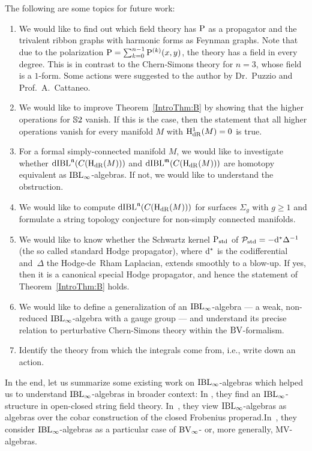 \documentclass[\MainFolder/Text.tex]{subfiles}
\begin{document}
The following are some topics for future work:

\begin{enumerate}[label=(\arabic*)]
\item We would like to find out which field theory has $\mathrm{P}$ as a propagator and the trivalent ribbon graphs with harmonic forms as Feynman graphs. Note that due to the polarization $\mathrm{P} = \sum_{k=0}^{n-1}\mathrm{P}^{(k)}(x,y)$, the theory has a field in every degree. This is in contrast to the Chern-Simons theory for $n=3$, whose field is a $1$-form. Some actions were suggested to the author by Dr.~Puzzio and Prof.~A.~Cattaneo.

\item We would like to improve Theorem~\ref{IntroThm:B} by showing that the higher operations for $\mathbb{S}{2}$ vanish. If this is the case,  then the statement that all higher operations vanish for every manifold $M$ with $\mathrm{H}_{\mathrm{dR}}^1(M)=0$ is true.
\item For a formal simply-connected manifold $M$, we would like to investigate whether $\mathrm{dIBL}^{\mathfrak{n}}(C(\mathrm{H}_{\mathrm{dR}}(M)))$ and $\mathrm{dIBL}^{\mathfrak{m}}(C(\mathrm{H}_{\mathrm{dR}}(M)))$ are homotopy equivalent as $\mathrm{IBL}_\infty$-algebras. If not, we would like to understand the obstruction. 
\item We would like to compute $\mathrm{dIBL}^{\mathfrak{n}}(C(\mathrm{H}_{\mathrm{dR}}(M)))$ for surfaces $\Sigma_g$ with $g\ge 1$ and formulate a string topology conjecture for non-simply connected manifolds. 
\item We would like to know whether the Schwartz kernel $\mathrm{P}_{\mathrm{std}}$ of $\mathcal{P}_{\mathrm{std}}=-\mathrm{d}^* \Delta^{-1}$ (the so called standard Hodge propagator), where $\mathrm{d}^*$ is the codifferential and~$\Delta$ the Hodge-de~Rham Laplacian, extends smoothly to a blow-up. If yes, then it is a canonical special Hodge propagator, and hence the statement of Theorem~\ref{IntroThm:B} holds.
\item We would like to define a generalization of an $\mathrm{IBL}_\infty$-algebra --- a weak, non-reduced $\mathrm{IBL}_\infty$-algebra with a gauge group --- and understand its precise relation to perturbative Chern-Simons theory within the $\mathrm{BV}$-formalism.
\item Identify the theory from which the integrals come from, i.e., write down an action.
\end{enumerate}

In the end, let us summarize some existing work on $\mathrm{IBL}_\infty$-algebras which helped us to understand $\mathrm{IBL}_\infty$-algebras in broader context: In \cite{Muenster2011}, they find an $\mathrm{IBL}_\infty$-structure in open-closed string field theory. In~\cite{Doubek2017}, they view $\mathrm{IBL}_\infty$-algebras as algebras over the cobar construction of the closed Frobenius properad.In~\cite{Markl2015}, they consider $\mathrm{IBL}_\infty$-algebras as a particular case of $\mathrm{BV}_\infty$- or,  more generally, $\mathrm{MV}$-algebras.
\end{document}
